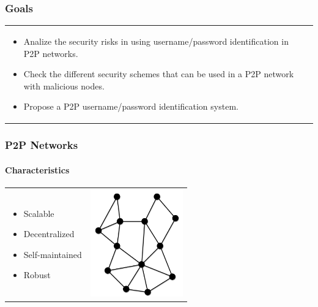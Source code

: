 
\begin{frame}
\frametitle{Goals}
\begin{table}
\begin{tabular}{p{7cm}p{3cm}}
\begin{itemize}
  \item Analize the security risks in using username/password identification in P2P networks. 
  \item Check the different security schemes that can be used in a P2P network with malicious nodes.
  \item Propose a P2P username/password identification system.
\end{itemize}
&
\vspace{1.5cm}
\end{tabular}
\end{table}
\end{frame}


\begin{frame}
\frametitle{P2P Networks}
\framesubtitle{Characteristics}
\begin{table}
\begin{tabular}{p{7cm}p{3cm}}
\begin{itemize}
  \item Scalable
  \item Decentralized
  \item Self-maintained
  \item Robust
\end{itemize}
&
\vspace{1.5cm}
\includegraphics[width=4cm]{img/p2p-unstructured}\\
\end{tabular}
\end{table}
\end{frame}

